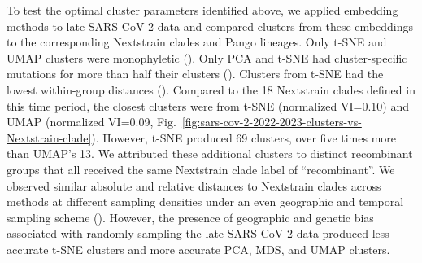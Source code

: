 \documentclass[10pt,letterpaper]{article}
\begin{document}
To test the optimal cluster parameters identified above, we applied embedding methods to late SARS-CoV-2 data and compared clusters from these embeddings to the corresponding Nextstrain clades and Pango lineages.
Only t-SNE and UMAP clusters were monophyletic ().
Only PCA and t-SNE had cluster-specific mutations for more than half their clusters ().
Clusters from t-SNE had the lowest within-group distances ().
Compared to the 18 Nextstrain clades defined in this time period, the closest clusters were from t-SNE (normalized VI=0.10) and UMAP (normalized VI=0.09, Fig.~\ref{fig:sars-cov-2-2022-2023-clusters-vs-Nextstrain-clade}).
However, t-SNE produced 69 clusters, over five times more than UMAP's 13.
We attributed these additional clusters to distinct recombinant groups that all received the same Nextstrain clade label of ``recombinant''.
We observed similar absolute and relative distances to Nextstrain clades across methods at different sampling densities under an even geographic and temporal sampling scheme ().
However, the presence of geographic and genetic bias associated with randomly sampling the late SARS-CoV-2 data produced less accurate t-SNE clusters and more accurate PCA, MDS, and UMAP clusters.
\end{document}
